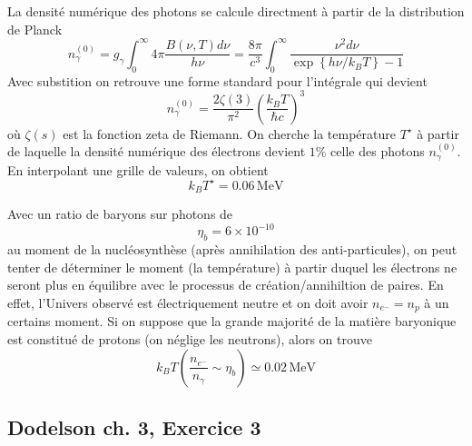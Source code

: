 \documentclass{article}
\numberwithin{equation}{section}
\begin{document}
La densité numérique des photons se calcule directment à partir de la distribution 
de Planck
\begin{equation}\label{eq:PlanckDensity} 
        n_\gamma^{(0)} = g_\gamma\int_0^{\infty}4\pi\frac{B(\nu, T) d\nu}{h\nu} = 
        \frac{8 \pi }{c^3}  \int_0^{\infty } 
        \frac{\nu^2 d\nu}{\exp \left\{ h\nu / k_B T \right\} - 1}
\end{equation} 
Avec substition on retrouve une forme standard pour l'intégrale qui devient
\[
        n_\gamma^{(0)} = \frac{2\zeta(3 )}{\pi^2} \left( \frac{k_B T}{\hbar c} \right)^{3}
\]
où $\zeta(s)$ est la fonction zeta de Riemann.
On cherche la température $T^\star$ à partir de laquelle la densité numérique des électrons 
devient $1\%$ celle des photons $n_\gamma^{(0)}$. En interpolant une grille de valeurs, 
on obtient
\[
        \boxed{k_BT^\star = 0.06\, \text{MeV}}
\]

Avec un ratio de baryons sur photons de
\[
        \eta_b = 6 \times 10^{-10}
\]
au moment de la nucléosynthèse (après annihilation des anti-particules), on peut 
tenter de déterminer le moment (la température) à partir duquel les électrons 
ne seront plus en équilibre avec le processus de création/annihiltion de paires. En 
effet, l'Univers observé est électriquement neutre et on doit avoir $n_{e^{-}} = n_p$ 
à un certains moment. Si on suppose que la grande majorité de la matière baryonique 
est constitué de protons (on néglige les neutrons), alors on trouve
\[
        \boxed{k_B T( \frac{n_{e^{-}}}{n_\gamma} \sim \eta_b) \simeq 0.02\, \text{MeV}}
\]

\subsection{Dodelson ch. 3, Exercice 3}
\end{document}
